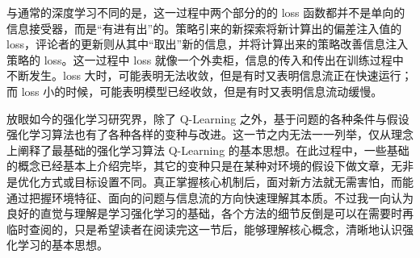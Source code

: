 与通常的深度学习不同的是，这一过程中两个部分的的 loss 函数都并不是单向的信息接受器，而是“有进有出”的。策略引来的新探索将新计算出的偏差注入值的 loss，评论者的更新则从其中“取出”新的信息，并将计算出来的策略改善信息注入策略的 loss。这一过程中 loss 就像一个外卖柜，信息的传入和传出在训练过程中不断发生。loss 大时，可能表明无法收敛，但是有时又表明信息流正在快速运行；而 loss 小的时候，可能表明模型已经收敛，但是有时又表明信息流动缓慢。

放眼如今的强化学习研究界，除了 Q-Learning 之外，基于问题的各种条件与假设强化学习算法也有了各种各样的变种与改进。这一节之内无法一一列举，仅从理念上阐释了最基础的强化学习算法 Q-Learning 的基本思想。在此过程中，一些基础的概念已经基本上介绍完毕，其它的变种只是在某种对环境的假设下做文章，无非是优化方式或目标设置不同。真正掌握核心机制后，面对新方法就无需害怕，而能通过把握环境特征、面向的问题与信息流的方向快速理解其本质。不过我一向认为良好的直觉与理解是学习强化学习的基础，各个方法的细节反倒是可以在需要时再临时查阅的，只是希望读者在阅读完这一节后，能够理解核心概念，清晰地认识强化学习的基本思想。

\newpage